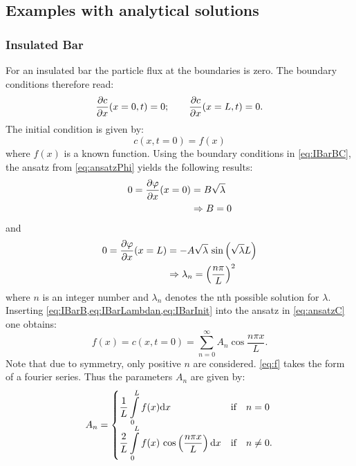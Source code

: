 \subsection{Examples with analytical solutions}
\subsubsection{Insulated Bar}
For an insulated bar the particle flux at the boundaries is zero. The boundary conditions therefore read:
\begin{equation}
  \frac{\partial c}{\partial x}(x=0,t) = 0; \qquad \frac{\partial c}{\partial x}(x=L,t)=0.
  \label{eq:IBarBC}
\end{equation}
The initial condition is given by:
\begin{equation}
  c(x,t=0) = f(x)
  \label{eq:IBarInit}
\end{equation}
where $f(x)$ is a known function. Using the boundary conditions in \cref{eq:IBarBC}, the ansatz from \cref{eq:ansatzPhi} yields the following results:
\begin{equation}
  \begin{split}
    0 = \frac{\partial \varphi}{\partial x}(x=0) &= B \sqrt{\lambda} \\
    &\Rightarrow B =0
  \end{split}
  \label{eq:IBarB}
\end{equation}
and 
\begin{equation}
  \begin{split}
  0 = \frac{\partial \varphi}{\partial x}(x=L) &= -A \sqrt{\lambda} \ {\rm sin}\left( {\sqrt{\lambda}L} \right) \\ &\Rightarrow \lambda_n = \left(\frac{n \pi}{L}\right)^2
  \end{split}
  \label{eq:IBarLambdan}
\end{equation}
where $n$ is an integer number and $\lambda_n$ denotes the nth possible solution for $\lambda$. Inserting \cref{eq:IBarB,eq:IBarLambdan,eq:IBarInit} into the ansatz in \cref{eq:ansatzC} one obtains:
\begin{equation}
  f(x) = c(x,t=0) = \sum_{n=0}^{\infty} A_n \cos{\frac{n\pi x}{L}}.
  \label{eq:f}
\end{equation}
Note that due to symmetry, only positive $n$ are considered. \cref{eq:f} takes the form of a fourier series. Thus the parameters $A_n$ are given by:
\begin{equation}
  A_n = \begin{cases}
    \displaystyle \frac{1}{L} \int\limits_0^L f(x) {\rm d} x & \text{if} \quad n = 0 \\
    \displaystyle \frac{2}{L} \int\limits_0^L f(x) \ {\rm cos}\left( {\frac{n\pi x}{L}} \right) {\rm d} x & \text{if} \quad n \ne 0.
  \end{cases}
\end{equation}

